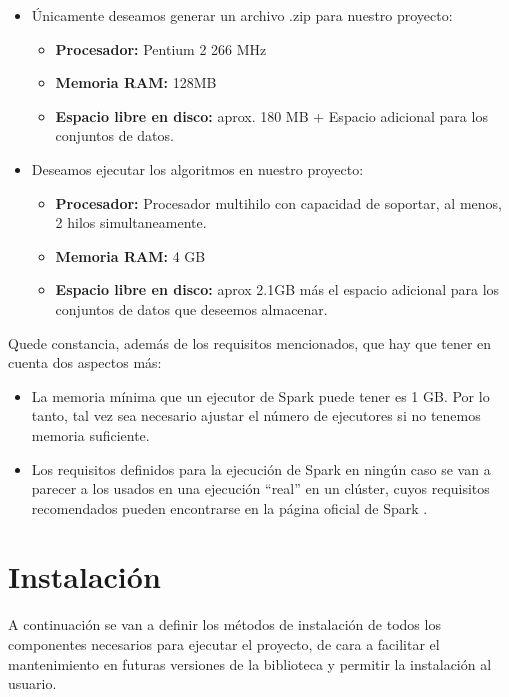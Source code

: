 \begin{itemize}
\item Únicamente deseamos generar un archivo .zip para nuestro proyecto:
	\begin{itemize}
	\item \textbf{Procesador:} Pentium 2 266 MHz \cite{minRequerimentsJava}
	\item \textbf{Memoria RAM:} 128MB \cite{minRequerimentsJava}
	\item \textbf{Espacio libre en disco:} aprox. 180 MB + Espacio adicional para los conjuntos de datos.
	\end{itemize}
\item Deseamos ejecutar los algoritmos en nuestro proyecto:
	\begin{itemize}
	\item \textbf{Procesador:} Procesador multihilo con capacidad de soportar, al menos, 2 hilos simultaneamente.
	\item \textbf{Memoria RAM:} 4 GB
	\item \textbf{Espacio libre en disco:} aprox 2.1GB más el espacio adicional para los conjuntos de datos que deseemos almacenar.
	\end{itemize}
\end{itemize}

Quede constancia, además de los requisitos mencionados, que hay que tener en cuenta dos aspectos más:
\begin{itemize}
\item La memoria mínima que un ejecutor de Spark puede tener es 1 GB. Por lo tanto, tal vez sea necesario ajustar el número de ejecutores si no tenemos memoria suficiente.
\item Los requisitos definidos para la ejecución de Spark en ningún caso se van a parecer a los usados en una ejecución ``real'' en un clúster, cuyos requisitos recomendados pueden encontrarse en la página oficial de Spark \cite{requisitosSpark}.
\end{itemize}


\section{Instalación}\label{sec:Instalacion}

A continuación se van a definir los métodos de instalación de todos los componentes necesarios para ejecutar el proyecto, de cara a facilitar el mantenimiento en futuras versiones de la biblioteca y permitir la instalación al usuario.

